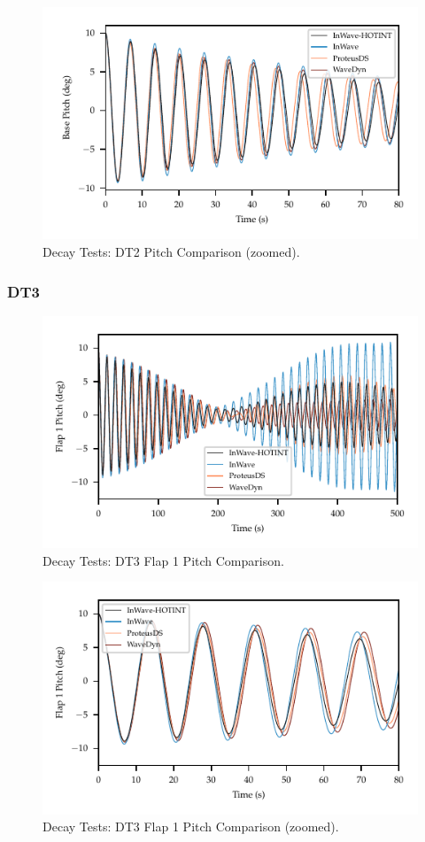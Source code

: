 \documentclass[11pt]{article}
\begin{document}
\begin{figure}[htbp]
\centering
\includegraphics[width=.9\linewidth]{images/dtzoom/DT2_PITCH.pdf}
\caption{Decay Tests: DT2 Pitch Comparison (zoomed).}
\end{figure}


\clearpage
\subsubsection{DT3}
\label{sec:org39f9777}
\begin{figure}[htbp]
\centering
\includegraphics[width=.9\linewidth]{images/dt/DT3_FLAP1.pdf}
\caption{Decay Tests: DT3 Flap 1 Pitch Comparison.}
\end{figure}

\begin{figure}[htbp]
\centering
\includegraphics[width=.9\linewidth]{images/dtzoom/DT3_FLAP1.pdf}
\caption{Decay Tests: DT3 Flap 1 Pitch Comparison (zoomed).}
\end{figure}
\end{document}
